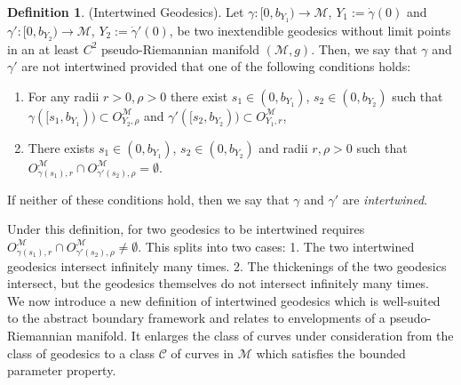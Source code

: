\documentclass[pdflatex,sn-mathphys-num]{sn-jnl}
\newcommand{\Junbang}[1]{{\color{magenta}#1}}
\theoremstyle{definition}
\newtheorem{defn}[theorem]{Definition}
\begin{document}
\begin{defn}
    (Intertwined Geodesics)\label{defn:intertwined}. Let $\gamma :[0,b_{Y_1}) \rightarrow \mathcal{M}$, $Y_1 := \dot{\gamma}(0)$ and $\gamma':[0,b_{Y_2}) \rightarrow \mathcal{M}$, $Y_2 := \dot{\gamma}'(0)$, be two inextendible geodesics without limit points in an at least $C^2$ pseudo-Riemannian manifold $(\mathcal{M}, g)$. Then, we say that $\gamma$ and $\gamma'$ are not intertwined provided that one of the following conditions holds:
    \begin{enumerate}
        \item For any radii $r > 0, \rho > 0$ there exist $s_1 \in (0, b_{Y_1})$, $s_2 \in (0, b_{Y_2})$ such that $\gamma([s_1, b_{Y_1})) \subset O^{\mathcal{M}}_{Y_2,\rho}$ and $\gamma'([s_2, b_{Y_2})) \subset O^{\mathcal{M}}_{Y_1,r}$,
        \item There exists $s_1 \in (0, b_{Y_1})$, $ s_2 \in (0, b_{Y_2})$ and radii $r, \rho > 0$ such that $O^{\mathcal{M}}_{\dot{\gamma}(s_1),r} \cap O^{\mathcal{M}}_{\dot{\gamma}'(s_2),\rho} = \emptyset$.
    \end{enumerate}
    If neither of these conditions hold, then we say that $\gamma$ and $\gamma'$ are {\it intertwined}.
\end{defn}

Under this definition, for two geodesics to be intertwined requires $O^{\mathcal{M}}_{\dot{\gamma}(s_1),r} \cap O^{\mathcal{M}}_{\dot{\gamma}'(s_2),\rho} \neq \emptyset$. This splits into two cases: 1. The two intertwined geodesics intersect infinitely many times. 2. The thickenings of the two geodesics intersect, but the geodesics themselves do not intersect infinitely many times.\\


We now introduce a new definition of intertwined geodesics which is well-suited to the abstract boundary framework and relates to envelopments of a pseudo-Riemannian manifold. It enlarges the class of curves under consideration from the class of geodesics to a class $\mathcal{C}$ of curves in $\mathcal{M}$ which satisfies the bounded parameter property.
\end{document}
